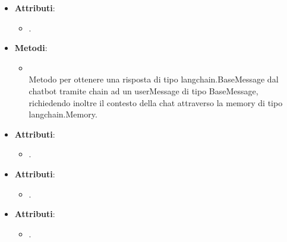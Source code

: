 \documentclass[10pt, a4paper]{article}
\begin{document}
    \label{ChatbotLangchainDettaglio}
    \begin{itemize}
        \item \textbf{Attributi}:
        \begin{itemize}
            \item {}.
        \end{itemize}
        \item \textbf{Metodi}:
        \begin{itemize}
            \item {}\\
            Metodo per ottenere una risposta di tipo langchain.BaseMessage dal chatbot tramite chain ad un userMessage di tipo BaseMessage, richiedendo inoltre il contesto della chat attraverso la memory di tipo langchain.Memory.
        \end{itemize}
    \end{itemize}
    
    \label{LangchainLLMDettaglio}
    \begin{itemize}
        \item \textbf{Attributi}:
        \begin{itemize}
            \item {}.
        \end{itemize}
    \end{itemize}
    
    \label{OpenAILLMDettaglio}
    \begin{itemize}
        \item \textbf{Attributi}:
        \begin{itemize}
            \item {}.
        \end{itemize}
    \end{itemize}
    
    \label{HugginFaceLLMDettaglio}
    \begin{itemize}
        \item \textbf{Attributi}:
        \begin{itemize}
            \item {}.
        \end{itemize}
    \end{itemize}
    
\end{document}
